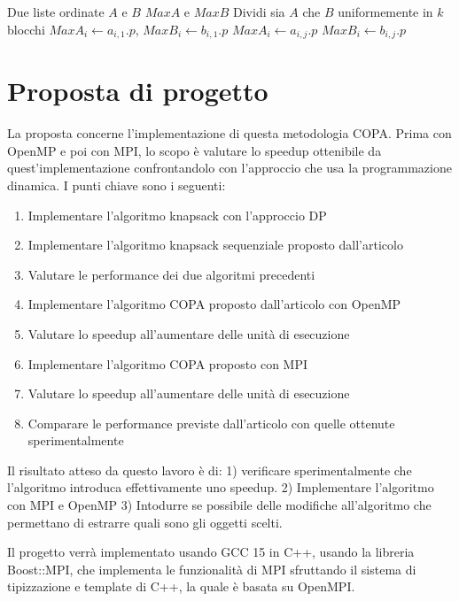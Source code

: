 \documentclass[11pt]{article}
\begin{document}
\begin{algorithm}[H]
\caption{Search max-value}\label{alg:parallel_max}
\begin{algorithmic}
\Require Due liste ordinate $A$ e $B$
\Ensure $MaxA$ e $MaxB$
\State Dividi sia $A$ che $B$ uniformemente in $k$ blocchi
    \State $MaxA_i \gets a_{i,1}.p$, \quad $MaxB_i \gets b_{i,1}.p$
            \State $MaxA_i \gets a_{i,j}.p$
        \EndIf
            \State $MaxB_i \gets b_{i,j}.p$
        \EndIf
    \EndFor
\EndFor
\end{algorithmic}
\end{algorithm}

\section{Proposta di progetto}
La proposta concerne l'implementazione di questa metodologia COPA. Prima con OpenMP e poi con MPI, lo scopo è valutare lo speedup ottenibile da quest'implementazione confrontandolo con l'approccio che usa la programmazione dinamica. I punti chiave sono i seguenti:
\begin{enumerate}
    \item Implementare l'algoritmo knapsack con l'approccio DP
    \item Implementare l'algoritmo knapsack sequenziale proposto dall'articolo 
    \item Valutare le performance dei due algoritmi precedenti
    \item Implementare l'algoritmo COPA proposto dall'articolo con OpenMP 
    \item Valutare lo speedup all'aumentare delle unità di esecuzione
    \item Implementare l'algoritmo COPA proposto con MPI 
    \item Valutare lo speedup all'aumentare delle unità di esecuzione
    \item Comparare le performance previste dall'articolo con quelle ottenute sperimentalmente
\end{enumerate}

Il risultato atteso da questo lavoro è di: 1) verificare sperimentalmente che l'algoritmo introduca effettivamente uno speedup. 2) Implementare l'algoritmo con MPI e OpenMP 3) Intodurre se possibile delle modifiche all'algoritmo che permettano di estrarre quali sono gli oggetti scelti. 

Il progetto verrà implementato usando GCC 15 in C++, usando la libreria Boost::MPI, che implementa le funzionalità di MPI sfruttando il sistema di tipizzazione e template di C++, la quale è basata su OpenMPI. 



\end{document}
